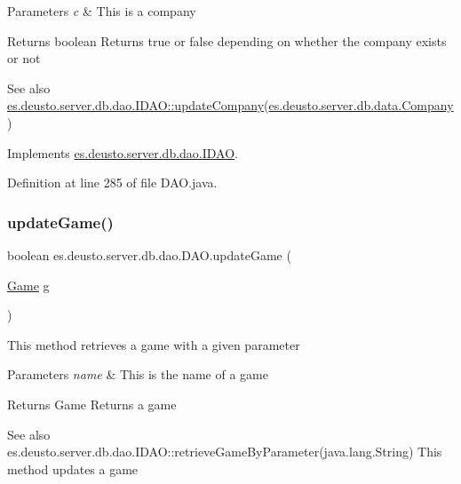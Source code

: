 \begin{DoxyParams}{Parameters}
{\em c} & This is a company \\
\hline
\end{DoxyParams}
\begin{DoxyReturn}{Returns}
boolean Returns true or false depending on whether the company exists or not 
\end{DoxyReturn}
\begin{DoxySeeAlso}{See also}
\hyperlink{interfacees_1_1deusto_1_1server_1_1db_1_1dao_1_1_i_d_a_o_a2d4302c61abd557f5a84d0698afdb814}{es.\+deusto.\+server.\+db.\+dao.\+I\+D\+A\+O\+::update\+Company}(\hyperlink{classes_1_1deusto_1_1server_1_1db_1_1data_1_1_company}{es.\+deusto.\+server.\+db.\+data.\+Company}) 
\end{DoxySeeAlso}


Implements \hyperlink{interfacees_1_1deusto_1_1server_1_1db_1_1dao_1_1_i_d_a_o_a2d4302c61abd557f5a84d0698afdb814}{es.\+deusto.\+server.\+db.\+dao.\+I\+D\+AO}.



Definition at line 285 of file D\+A\+O.\+java.

\mbox{\label{classes_1_1deusto_1_1server_1_1db_1_1dao_1_1_d_a_o_ae7540010b43f96c5e50995a8376614e7}} 
\subsubsection{\texorpdfstring{update\+Game()}{updateGame()}}
{\footnotesize\ttfamily boolean es.\+deusto.\+server.\+db.\+dao.\+D\+A\+O.\+update\+Game (\begin{DoxyParamCaption}\item[{\hyperlink{classes_1_1deusto_1_1server_1_1db_1_1data_1_1_game}{Game}}]{g }\end{DoxyParamCaption})}

This method retrieves a game with a given parameter 
\begin{DoxyParams}{Parameters}
{\em name} & This is the name of a game \\
\hline
\end{DoxyParams}
\begin{DoxyReturn}{Returns}
Game Returns a game 
\end{DoxyReturn}
\begin{DoxySeeAlso}{See also}
es.\+deusto.\+server.\+db.\+dao.\+I\+D\+A\+O\+::retrieve\+Game\+By\+Parameter(java.\+lang.\+String) This method updates a game 
\end{DoxySeeAlso}

